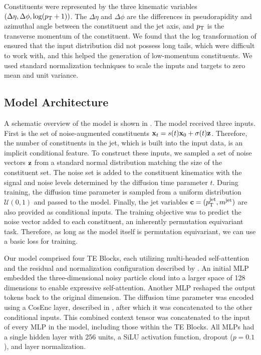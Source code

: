 Constituents were represented by the three kinematic variables $\left(\Delta\eta, \Delta\phi, \log(p_\mathrm{T} + 1)\right)$.
The $\Delta\eta$ and $\Delta\phi$ are the differences in pseudorapidity and azimuthal angle between the constituent and the jet axis, and $p_\mathrm{T}$ is the transverse momentum of the constituent.
We found that the log transformation of \pt ensured that the input distribution did not possess long tails, which were difficult to work with, and this helped the generation of low-momentum constituents.
We used standard normalization techniques to scale the inputs and targets to zero mean and unit variance.

\subsection{Model Architecture}

A schematic overview of the \pcjedi model is shown in .
The model received three inputs.
First is the set of noise-augmented constituents $\mathbf{x}_t = s(t) \mathbf{x}_0 + \sigma(t) \mathbf{z}$.
Therefore, the number of constituents in the jet, which is built into the input data, is an implicit conditional feature.
To construct these inputs, we sampled a set of noise vectors $\mathbf{z}$ from a standard normal distribution matching the size of the constituent set.
The noise set is added to the constituent kinematics with the signal and noise levels determined by the diffusion time parameter $t$.
During training, the diffusion time parameter is sampled from a uniform distribution $\mathcal{U}(0, 1)$ and passed to the model.
Finally, the jet variables $\mathbf{c} = (p_\mathrm{T}^{\text{jet}}, m^{\text{jet}})$ are also provided as conditional inputs.
The training objective was to predict the noise vector added to each constituent, an inherently permutation equivariant task.
Therefore, as long as the model itself is permutation equivariant, we can use a basic loss for training.

Our model comprised four TE Blocks, each utilizing multi-headed self-attention and the residual and normalization configuration described by \textcite{Normformer}.
An initial MLP embedded the three-dimensional noisy particle cloud into a larger space of 128 dimensions to enable expressive self-attention.
Another MLP reshaped the output tokens back to the original dimension.
The diffusion time parameter was encoded using a CosEnc layer, described in , after which it was concatenated to the other conditional inputs.
This combined context tensor was concatenated to the input of every MLP in the model, including those within the TE Blocks.
All MLPs had a single hidden layer with 256 units, a SiLU activation function, dropout ($p=0.1$), and layer normalization.

